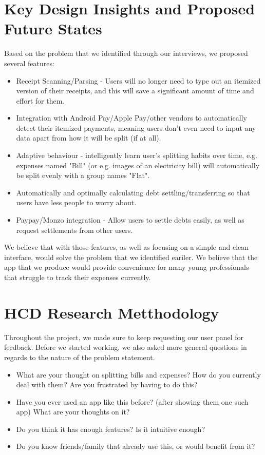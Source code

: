 \documentclass[a4wide, 10pt]{article}
\begin{document}
\section{Key Design Insights and Proposed Future States}
\vspace{-3ex}
Based on the problem that we identified through our interviews, we proposed several features:
\begin{itemize}
\item Receipt Scanning/Parsing - Users will no longer need to type out an itemized version of their receipts, and this will save a significant amount of time and effort for them.
\item Integration with Android Pay/Apple Pay/other vendors to automatically detect their itemized payments, meaning users don't even need to input any data apart from how it will be split (if at all).
\item Adaptive behaviour - intelligently learn user's splitting habits over time, e.g. expenses named "Bill" (or e.g. images of an electricity bill) will automatically be split evenly with a group names "Flat".
\item Automatically and optimally calculating debt settling/transferring so that users have less people to worry about.
\item Paypay/Monzo integration - Allow users to settle debts easily, as well as request settlements from other users.
\end{itemize} 

We believe that with those features, as well as focusing on a simple and clean interface, would solve the problem that we identified eariler. We believe that the app that we produce would provide convenience for many young professionals that struggle to track their expenses currently.

\section{HCD Research Metthodology}
\vspace{-3ex}
Throughout the project, we made sure to keep requesting our user panel for feedback. Before we started working, we also asked more general questions in regards to the nature of the problem statement.

\begin{itemize}
\item What are your thought on splitting bills and expenses? How do you currently deal with them? Are you frustrated by having to do this?
\item Have you ever used an app like this before? (after showing them one such app) What are your thoughts on it?
\item Do you think it has enough features? Is it intuitive enough?
\item Do you know friends/family that already use this, or would benefit from it?
\end{itemize} 
\end{document}

